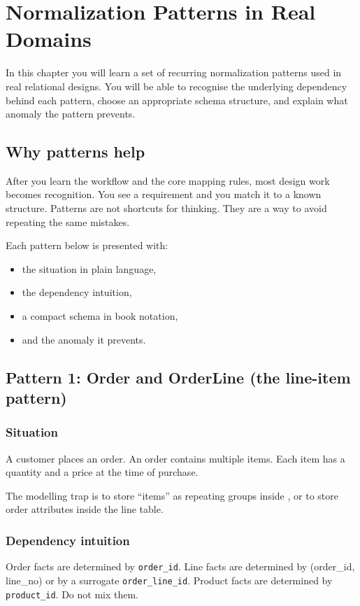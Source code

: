 \chapter{Normalization Patterns in Real Domains}

\begin{learningobjectives}
In this chapter you will learn a set of recurring normalization patterns used in real relational designs.
You will be able to recognise the underlying dependency behind each pattern, choose an appropriate schema structure, and explain what anomaly the pattern prevents.
\end{learningobjectives}

\section{Why patterns help}
After you learn the workflow and the core mapping rules, most design work becomes recognition.
You see a requirement and you match it to a known structure.
Patterns are not shortcuts for thinking.
They are a way to avoid repeating the same mistakes.

Each pattern below is presented with:
\begin{itemize}
  \item the situation in plain language,
  \item the dependency intuition,
  \item a compact schema in book notation,
  \item and the anomaly it prevents.
\end{itemize}

\section{Pattern 1: Order and OrderLine (the line-item pattern)}
\subsection{Situation}
A customer places an order.
An order contains multiple items.
Each item has a quantity and a price at the time of purchase.

The modelling trap is to store “items” as repeating groups inside , or to store order attributes inside the line table.

\subsection{Dependency intuition}
Order facts are determined by \texttt{order\_id}.
Line facts are determined by (order\_id, line\_no) or by a surrogate \texttt{order\_line\_id}.
Product facts are determined by \texttt{product\_id}.
Do not mix them.

